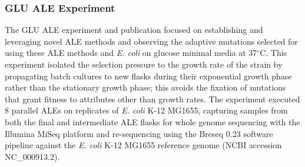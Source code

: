 \documentclass[12pt,final,masters,chapterheads]{ucsd}  %
\begin{document}
\subsubsection{GLU ALE Experiment}
%
%
The GLU ALE experiment and publication focused on establishing and leveraging novel ALE methods and observing the adaptive mutations selected for using these ALE methods and \textit{E. coli} on glucose minimal media at 37$^{\circ}$C. This experiment isolated the selection pressure to the growth rate of the strain by propagating batch cultures to new flasks during their exponential growth phase rather than the stationary growth phase; this avoids the fixation of mutations that grant fitness to attributes other than growth rates. The experiment executed 8 parallel ALEs on replicates of \textit{E. coli} K-12 MG1655, capturing samples from both the final and intermediate ALE flasks for whole genome sequencing with the Illumina MiSeq platform and re-sequencing using the Breseq 0.23 software pipeline against the \textit{E. coli} K-12 MG1655 reference genome (NCBI accession NC\_000913.2).
\end{document}
